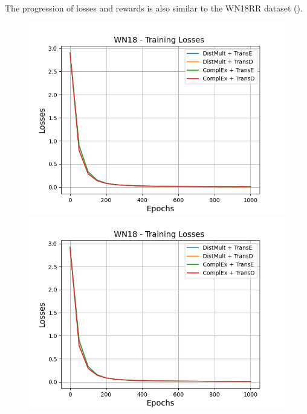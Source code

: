 The progression of losses and rewards is also similar to the \textsc{WN18RR} dataset ().
\begin{figure}
    \centering
    \begin{minipage}{.5\textwidth}
      \centering
      \includegraphics[width=0.9\linewidth]{figures/results/gan_train/not_pretrained/uncertainty/max/entropy/wn18/uncertainty_wn18_losses.png}
    \end{minipage}%
    \begin{minipage}{.5\textwidth}
      \centering
      \includegraphics[width=0.9\linewidth]{figures/results/gan_train/not_pretrained/uncertainty/max_distribution/entropy/wn18/uncertainty_wn18_losses.png}
    \end{minipage}
    \begin{minipage}{.5\textwidth}
      \centering

\end{minipage}
\end{figure}
